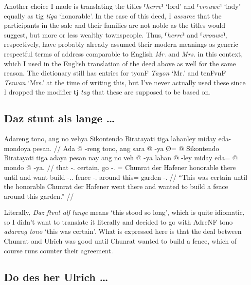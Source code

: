 \documentclass[12pt,paper=a4]{scrartcl}
\newcommand{\fw}[1]{\textit{#1}} %
\newcommand{\norm}[1]{⸢\textit{#1}⸣} %
\newcommand{\ayr}[1]{{\Tagati #1}}
\newcommand{\xayr}[3]{{\Tagati #1} \emph{#2} \enquote*{#3}}
\begin{document}
Another choice I made is translating the titles \norm{herre} `lord' and 
\norm{vrouwe} `lady' equally as \xayr{tig}{tiga} {honorable}. In the case of 
this deed, I \emph{assume} that the participants in the sale and their families 
are not noble as the titles would suggest, but more or less wealthy townspeople. 
Thus, \norm{herre} and \norm{vrouwe}, respectively, have probably already 
assumed their modern meanings as generic respectful terms of address comparable 
to English \fw{Mr.} and \fw{Mrs.} in this context, which I used in the English 
translation of the deed above as well for the same reason. The dictionary still 
has entries for \xayr{tyonF}{Tayon}{Mr.} and \xayr{tenFvnF}{Tenvan}{Mrs.} 
at the time of writing this, but I've never actually used these since I dropped 
the modifier \ayr{tj} \fw{tay} that these are supposed to be based on.

\subsection*{Daz stunt als lange …}


\ex \begingl
	\glpreamble Adareng tono, ang no vehya Sikontendo Biratayati tiga
		lahanley miday eda-mondoya pesan. //
	\gla Ada @ -reng tono, ang sara @ -ya Ø= @ Sikontendo Biratayati tiga
		adaya pesan nay ang no veh @ -ya lahan @ -ley miday eda= @ mondo 
		@ -ya. //
	\glb that -\Aarg{}.\Inan{} certain, \AgtT{} go -\Tsg{}.\M{} \Top{}= 
		Chunrat {der Hafener} honorable there until and \AgtT{} want 
		build -\Tsg{}.\M{}.\Top{} fence -\Parg{}.\Inan{} around this= 
		garden -\Loc{}. //
	\glft \enquote{This was certain until the honorable Chunrat der Hafener 
		went there and wanted to build a fence around this garden.} //
\endgl \xe

Literally, \fw{Daz ſtvnt alſ lange} means `this stood so long', which is 
quite idiomatic, so I didn't want to translate it literally and decided to go 
with \xayr{AdreNF tono}{adareng tono}{this was certain}. What is expressed 
here is that the deal between Chunrat and Ulrich was good until Chunrat wanted 
to build a fence, which of course runs counter their agreement.

\subsection*{Do des her Ulrich …}
\end{document}
